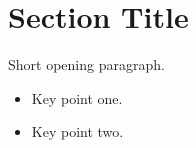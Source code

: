 
\section{Section Title}

Short opening paragraph.

\begin{itemize}[leftmargin=1.5em]
\item Key point one.
\item Key point two.
\end{itemize}
